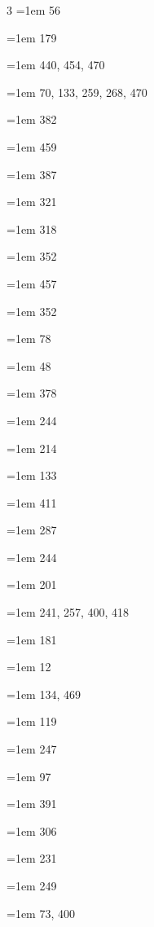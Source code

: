 \begin{multicols}{3}
\hangindent=1em  56\par
\hangindent=1em  179\par
\hangindent=1em  440, 454, 470\par
\hangindent=1em  70, 133, 259, 268, 470\par
\hangindent=1em  382\par
\hangindent=1em  459\par
\hangindent=1em  387\par
\hangindent=1em  321\par
\hangindent=1em  318\par
\hangindent=1em  352\par
\hangindent=1em  457\par
\hangindent=1em  352\par
\hangindent=1em  78\par
\hangindent=1em  48\par
\hangindent=1em  378\par
\hangindent=1em  244\par
\hangindent=1em  214\par
\hangindent=1em  133\par
\hangindent=1em  411\par
\hangindent=1em  287\par
\hangindent=1em  244\par
\hangindent=1em  201\par
\hangindent=1em  241, 257, 400, 418\par
\hangindent=1em  181\par
\hangindent=1em  12\par
\hangindent=1em  134, 469\par
\hangindent=1em  119\par
\hangindent=1em  247\par
\hangindent=1em  97\par
\hangindent=1em  391\par
\hangindent=1em  306\par
\hangindent=1em  231\par
\hangindent=1em  249\par
\hangindent=1em  73, 400\par

\end{multicols}
